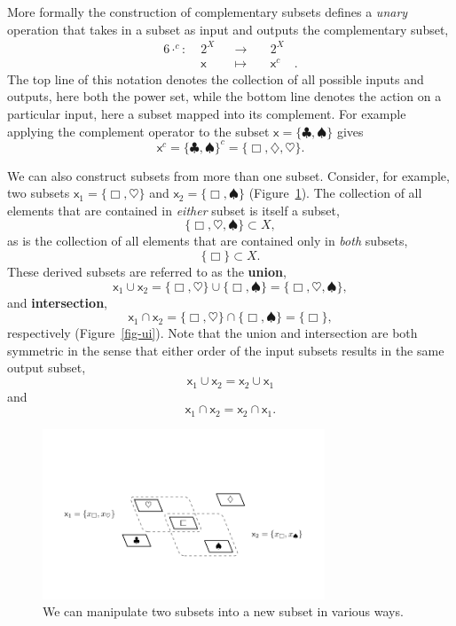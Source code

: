 \documentclass[
  letterpaper,
  DIV=11,
  numbers=noendperiod]{scrartcl}
\begin{document}
More formally the construction of complementary subsets defines a
\emph{unary} operation that takes in a subset as input and outputs the
complementary subset, \begin{alignat*}{6}
\cdot^c :\; & 2^X & &\rightarrow& \; & 2^X &
\\
& \mathsf{x} & &\mapsto& & \mathsf{x}^{c} &.
\end{alignat*} The top line of this notation denotes the collection of
all possible inputs and outputs, here both the power set, while the
bottom line denotes the action on a particular input, here a subset
mapped into its complement. For example applying the complement operator
to the subset \(\mathsf{x} = \{ \clubsuit, \spadesuit \}\) gives \[
\mathsf{x}^{c}
= \{ \clubsuit, \spadesuit \}^{c}
= \{ \Box, \diamondsuit, \heartsuit \}.
\]

We can also construct subsets from more than one subset. Consider, for
example, two subsets \(\mathsf{x}_1 = \{ \Box, \heartsuit \}\) and
\(\mathsf{x}_2 = \{ \Box, \spadesuit \}\) (Figure~\ref{fig-subsets}).
The collection of all elements that are contained in \emph{either}
subset is itself a subset, \[
\{ \Box, \heartsuit, \spadesuit \} \subset X,
\] as is the collection of all elements that are contained only in
\emph{both} subsets, \[
\{ \Box \} \subset X.
\] These derived subsets are referred to as the \textbf{union}, \[
\mathsf{x}_1 \cup \mathsf{x}_2
= \{ \Box, \heartsuit \} \cup \{ \Box, \spadesuit \}
= \{ \Box, \heartsuit, \spadesuit \},
\] and \textbf{intersection}, \[
\mathsf{x}_1 \cap \mathsf{x}_2
= \{ \Box, \heartsuit \} \cap \{ \Box, \spadesuit \}
= \{ \Box \},
\] respectively (Figure~\ref{fig-ui}). Note that the union and
intersection are both symmetric in the sense that either order of the
input subsets results in the same output subset, \[
\mathsf{x}_1 \cup \mathsf{x}_2 = \mathsf{x}_2 \cup \mathsf{x}_1
\] and \[
\mathsf{x}_1 \cap \mathsf{x}_2 = \mathsf{x}_2 \cap \mathsf{x}_1.
\]

\begin{figure}

{\centering \includegraphics[width=0.75\textwidth,height=\textheight]{figures/overlapping_subsets/overlapping_subsets.pdf}

}

\caption{\label{fig-subsets}We can manipulate two subsets into a new
subset in various ways.}

\end{figure}
\end{document}
